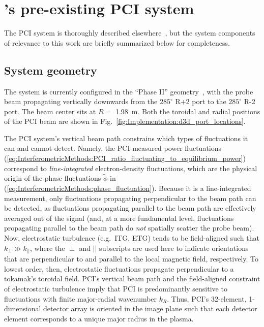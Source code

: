 \section{\diiid's pre-existing PCI system}
The \diiid \space PCI system is
thoroughly described elsewhere~\cite{dorris_rsi09, dorris_phd}, but
the system components of relevance to this work
are briefly summarized below for completeness.


\subsection{System geometry}
The system is currently configured
in the ``Phase II'' geometry~\cite{dorris_rsi09},
with the probe beam propagating vertically downwards
from the $285^{\circ}$ R+2 port to the $285^{\circ}$ R-2 port.
The beam center sits at $R = $ \SI{1.98}{\meter}.
Both the toroidal and radial positions
of the PCI beam are shown in
Fig.~\ref{fig:Implementation:d3d_port_locations}.

The PCI system's vertical beam path constrains
which types of fluctuations it can and cannot detect.
Namely, the PCI-measured power fluctuations
(\ref{eq:InterferometricMethods:PCI_ratio_fluctuating_to_equilibrium_power})
correspond to \emph{line-integrated} electron-density fluctuations, which
are the physical origin of the phase fluctuations $\tilde{\phi}$ in
(\ref{eq:InterferometricMethods:phase_fluctuation}).
Because it is a line-integrated measurement,
only fluctuations propagating perpendicular to the beam path can be detected,
as fluctuations propagating parallel to the beam path
are effectively averaged out of the signal
\graffito{\textcolor{red}{what about $\delta \omega$?}}
(and, at a more fundamental level, fluctuations propagating
parallel to the beam path do \emph{not} spatially scatter the probe beam).
\graffito{\textcolor{red}{citation? Wesson?}}
Now, electrostatic turbulence (e.g.\ ITG, ETG) tends to be field-aligned
such that $k_{\perp} \gg k_{||}$, where
the $\perp$ and $||$ subscripts are used here to indicate
orientations that are perpendicular to and parallel to
the local magnetic field, respectively.
To lowest order, then, electrostatic fluctuations propagate
perpendicular to a tokamak's toroidal field.
PCI's vertical beam path and
the field-aligned constraint of electrostatic turbulence
imply that PCI is predominantly sensitive to fluctuations
with finite major-radial wavenumber $k_R$.
Thus, PCI's 32-element, 1-dimensional detector array
is oriented in the image plane such that
each detector element corresponds to a unique major radius in the plasma.

